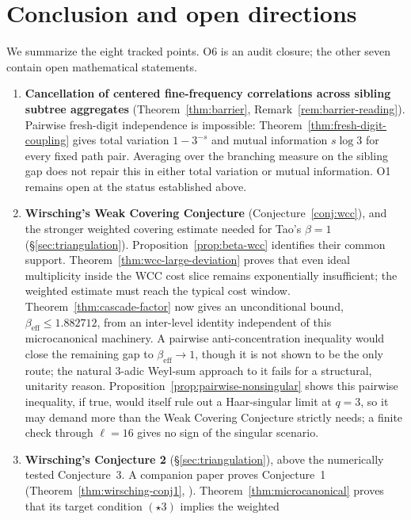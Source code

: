 \documentclass[11pt]{article}
\theoremstyle{definition}
\theoremstyle{remark}
\begin{document}
\section{Conclusion and open directions}
\label{sec:conclusion}

We summarize the eight tracked points. O6 is an audit closure; the
other seven contain open mathematical statements.

\begin{enumerate}[label=(O\arabic*)]
\item \textbf{Cancellation of centered fine-frequency correlations
  across sibling subtree aggregates} (Theorem~\ref{thm:barrier},
  Remark~\ref{rem:barrier-reading}). Pairwise fresh-digit independence
  is impossible: Theorem~\ref{thm:fresh-digit-coupling} gives total
  variation $1-3^{-s}$ and mutual information $s\log3$ for every fixed
  path pair. Averaging over the branching measure on the sibling gap
  does not repair this in either total variation or mutual information.
  O1 remains open at the status established above.
\item \textbf{Wirsching's Weak Covering Conjecture} (Conjecture~\ref{conj:wcc}),
  and the stronger weighted covering estimate needed for Tao's
  $\beta=1$ (\S\ref{sec:triangulation}). Proposition~\ref{prop:beta-wcc}
  identifies their common support. Theorem~\ref{thm:wcc-large-deviation}
  proves that even ideal multiplicity inside the WCC cost slice remains
  exponentially insufficient; the weighted estimate must reach the
  typical cost window. Theorem~\ref{thm:cascade-factor} now gives an
  unconditional bound, $\beta_{\mathrm{eff}}\le1.882712$, from an
  inter-level identity independent of this microcanonical machinery. A
  pairwise anti-concentration inequality would close the remaining gap
  to $\beta_{\mathrm{eff}}\to1$, though it is not shown to be the only
  route; the natural $3$-adic Weyl-sum approach to it fails for a
  structural, unitarity reason. Proposition~\ref{prop:pairwise-nonsingular}
  shows this pairwise inequality, if true, would itself rule out a
  Haar-singular limit at $q=3$, so it may demand more than the Weak
  Covering Conjecture strictly needs; a finite check through $\ell=16$
  gives no sign of the singular scenario.
\item \textbf{Wirsching's Conjecture 2} (\S\ref{sec:triangulation}),
  above the numerically tested Conjecture~3. A companion paper proves
  Conjecture~1 (Theorem~\ref{thm:wirsching-conj1},
  \cite{WirschingCompanion}). Theorem~\ref{thm:microcanonical}
  proves that its target condition $(\star3)$ implies the weighted

\end{enumerate}
\end{document}
